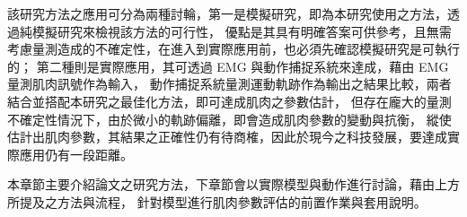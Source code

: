 該研究方法之應用可分為兩種討輪，第一是模擬研究，即為本研究使用之方法，透過純模擬研究來檢視該方法的可行性，
優點是其具有明確答案可供參考，且無需考慮量測造成的不確定性，在進入到實際應用前，也必須先確認模擬研究是可執行的；
第二種則是實際應用，其可透過 EMG 與動作捕捉系統來達成，藉由 EMG 量測肌肉訊號作為輸入，
動作捕捉系統量測運動軌跡作為輸出之結果比較，兩者結合並搭配本研究之最佳化方法，即可達成肌肉之參數估計，
但存在龐大的量測不確定性情況下，由於微小的軌跡偏離，即會造成肌肉參數的變動與抗衡，
縱使估計出肌肉參數，其結果之正確性仍有待商榷，因此於現今之科技發展，要達成實際應用仍有一段距離。

本章節主要介紹論文之研究方法，下章節會以實際模型與動作進行討論，藉由上方所提及之方法與流程，
針對模型進行肌肉參數評估的前置作業與套用說明。

\clearpage